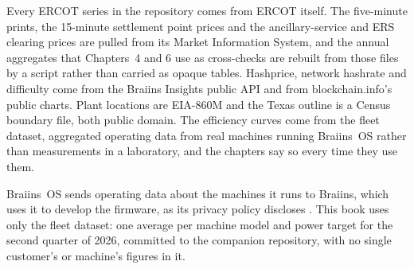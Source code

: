 Every ERCOT series in the repository comes from ERCOT itself. The
five-minute prints, the 15-minute settlement point prices and the
ancillary-service and ERS clearing prices are pulled from its Market Information
System, and the annual aggregates that Chapters~4 and 6 use as cross-checks are
rebuilt from those files by a script rather than carried as
opaque tables. Hashprice,
network hashrate and difficulty come from the Braiins Insights public API and
from blockchain.info's public charts. Plant locations are EIA-860M and the Texas
outline is a Census boundary file, both public domain. The efficiency curves come
from the fleet dataset, aggregated operating data from real machines running
Braiins~OS rather than measurements in a laboratory, and the chapters say so every time they use them. %

Braiins~OS sends operating data about the machines it runs to Braiins, which uses
it to develop the firmware, as its privacy policy discloses \autocite{braiins2020osprivacy}.
This book uses only the fleet dataset: one average per machine model and power
target for the second quarter of 2026, committed to the companion repository,
with no single customer's or machine's figures in it. %


